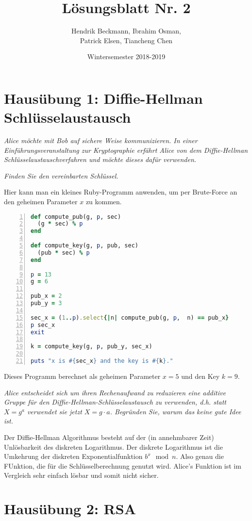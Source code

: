 \documentclass[
  ngerman,
  DIV=12
]{scrartcl}
\title{Lösungsblatt Nr. 2}
\date{Wintersemester 2018-2019}
\author{Hendrik Beckmann, Ibrahim Osman,\\Patrick Elsen, Tiancheng Chen}
\begin{document}
\maketitle

\section*{Hausübung 1: Diffie-Hellman Schlüsselaustausch}

\emph{Alice möchte mit Bob auf sichere Weise kommunizieren. In einer Einführungsveranstaltung zur Kryptographie erfährt Alice von dem Diffie-Hellman Schlüsselaustauschverfahren und möchte dieses dafür verwenden.}

\emph{Finden Sie den vereinbarten Schlüssel.}

Hier kann man ein kleines Ruby-Programm anwenden, um per Brute-Force an den geheimen Parameter $x$ zu kommen.
\begin{lstlisting}[language=ruby,numbers=left]
def compute_pub(g, p, sec)
  (g * sec) % p
end

def compute_key(g, p, pub, sec)
  (pub * sec) % p
end

p = 13
g = 6

pub_x = 2
pub_y = 3

sec_x = (1..p).select{|n| compute_pub(g, p,  n) == pub_x}
p sec_x
exit

k = compute_key(g, p, pub_y, sec_x)

puts "x is #{sec_x} and the key is #{k}."  
\end{lstlisting}
Dieses Programm berechnet als geheimen Parameter $x = 5$ und den Key $k = 9$.


\emph{Alice entscheidet sich um ihren Rechenaufwand zu reduzieren eine additive Gruppe für den Diffie-Hellman-Schlüsselaustausch zu verwenden, d.h. statt $X = g^a$ verwendet sie jetzt $X = g \cdot a$. Begründen Sie, warum das keine gute Idee ist.}

Der Diffie-Hellman Algorithmus besteht  auf der (in annehmbarer Zeit) Unlösbarkeit des diskreten Logarithmus. Der diskrete Logarithmus ist die Umkehrung der diskreten Exponentialfunktion $b^x \mod n$. Also genau die FUnktion, die für die Schlüsselberechnung genutzt wird. Alice's Funktion ist im Vergleich sehr einfach lösbar und somit nicht sicher.

\section*{Hausübung 2: RSA}
\end{document}
